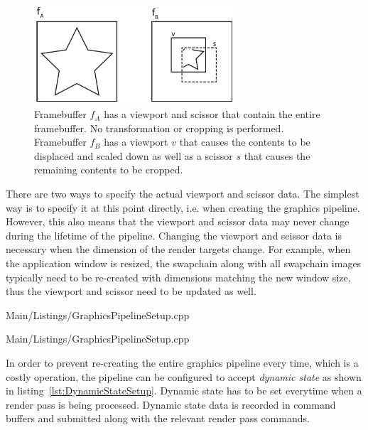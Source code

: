         \begin{figure}
          \includegraphics[width=0.666\textwidth]{Main/Images/ViewportScissorSample}
          \centering
          \caption{Framebuffer {\large$f_A$} has a viewport and scissor that contain the entire framebuffer. No transformation or cropping is performed. Framebuffer {\large$f_B$} has a viewport {\large$v$} that causes the contents to be displaced and scaled down as well as a scissor {\large$s$} that causes the remaining contents to be cropped.}
          \label{fig:ViewportScissorSample}
        \end{figure}

        There are two ways to specify the actual viewport and scissor data.
        The simplest way is to specify it at this point directly, i.e. when creating the graphics pipeline.
        However, this also means that the viewport and scissor data may never change during the lifetime of the pipeline.
        Changing the viewport and scissor data is necessary when the dimension of the render targets change.
        For example, when the application window is resized, the swapchain along with all swapchain images typically need to be re-created with dimensions matching the new window size, thus the viewport and scissor need to be updated as well.

        
        {Main/Listings/GraphicsPipelineSetup.cpp}

        
        {Main/Listings/GraphicsPipelineSetup.cpp}

        In order to prevent re-creating the entire graphics pipeline every time, which is a costly operation, the pipeline can be configured to accept \textit{dynamic state} as shown in listing~\ref{lst:DynamicStateSetup}.
        Dynamic state has to be set everytime when a render pass is being processed.
        Dynamic state data is recorded in command buffers and submitted along with the relevant render pass commands.


